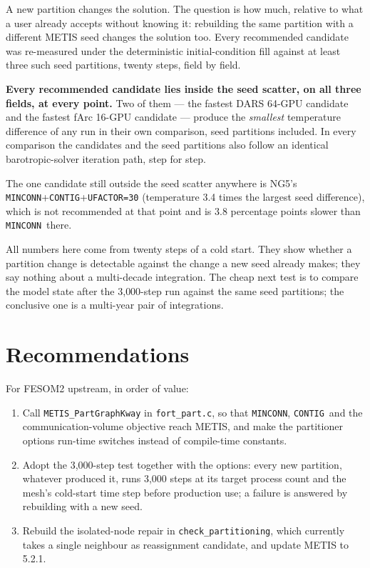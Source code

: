 \documentclass[11pt,a4paper]{article}
\newcommand{\minconn}{\texttt{MINCONN}}
\newcommand{\contig}{\texttt{CONTIG}}
\begin{document}
A new partition changes the solution. The question is how much, relative to what a user already
accepts without knowing it: rebuilding the same partition with a different METIS seed changes
the solution too. Every recommended candidate was re-measured under the deterministic
initial-condition fill against at least three such seed partitions, twenty steps, field by field.

\textbf{Every recommended candidate lies inside the seed scatter, on all three fields, at every
point.} Two of them --- the fastest DARS 64-GPU candidate and the fastest fArc 16-GPU candidate
--- produce the \emph{smallest} temperature difference of any run in their own comparison,
seed partitions included. In every comparison the candidates and the seed partitions also
follow an identical barotropic-solver iteration path, step for step.

The one candidate still outside the seed scatter anywhere is NG5's
\minconn+\contig+\texttt{UFACTOR=30} (temperature 3.4 times the largest seed difference), which
is not recommended at that point and is 3.8 percentage points slower than \minconn\ there.

All numbers here come from twenty steps of a cold start. They show whether a partition change is
detectable against the change a new seed already makes; they say nothing about a multi-decade
integration. The cheap next test is to compare the model state after the 3{,}000-step run
against the same seed partitions; the conclusive one is a multi-year pair of integrations.

\section{Recommendations}

For FESOM2 upstream, in order of value:
\begin{enumerate}\itemsep2pt
\item Call \texttt{METIS\_PartGraphKway} in \texttt{fort\_part.c}, so that \minconn, \contig\
and the communication-volume objective reach METIS, and make the partitioner options run-time
switches instead of compile-time constants.
\item Adopt the 3{,}000-step test together with the options: every new partition, whatever
produced it, runs 3{,}000 steps at its target process count and the mesh's cold-start time
step before production use; a failure is answered by rebuilding with a new seed.
\item Rebuild the isolated-node repair in \texttt{check\_partitioning}, which currently takes
a single neighbour as reassignment candidate, and update METIS to 5.2.1.
\end{enumerate}
\end{document}
